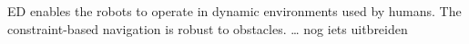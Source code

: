 ED enables the robots to operate in dynamic environments used by humans. The constraint-based navigation is robust to obstacles.
… nog iets uitbreiden